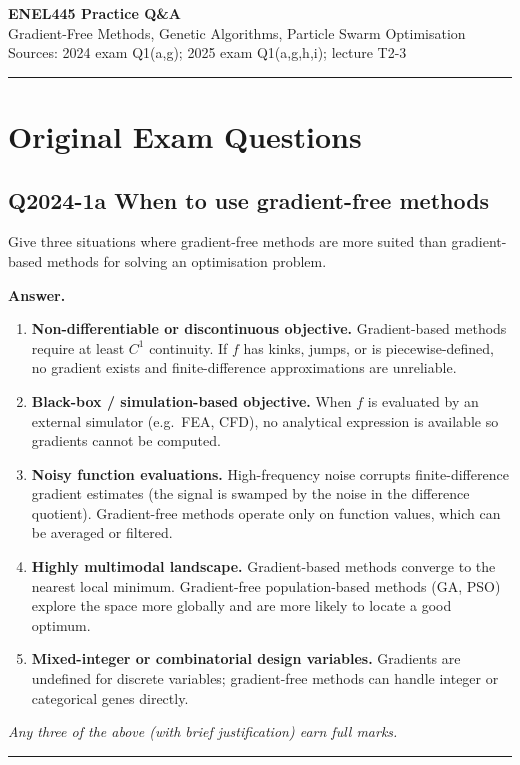 \documentclass[11pt,a4paper]{article}
\newcommand{\Q}[2]{\subsection*{Q#1 \quad #2}}
\newenvironment{answer}{\medskip\textbf{Answer.}\par}{\bigskip\hrule\bigskip}
\begin{document}
\begin{center}
  {\Large\bfseries ENEL445 Practice Q\&A}\\[4pt]
  Gradient-Free Methods, Genetic Algorithms, Particle Swarm Optimisation\\[2pt]
  {\small Sources: 2024 exam Q1(a,g); 2025 exam Q1(a,g,h,i); lecture T2-3}
\end{center}

\bigskip
\hrule
\bigskip

\section*{Original Exam Questions}

\Q{2024-1a}{[3 marks] When to use gradient-free methods}
Give three situations where gradient-free methods are more suited than
gradient-based methods for solving an optimisation problem.

\begin{answer}
\begin{enumerate}[leftmargin=*, label=\arabic{*}.]
  \item \textbf{Non-differentiable or discontinuous objective.}
    Gradient-based methods require at least $C^1$ continuity.
    If $f$ has kinks, jumps, or is piecewise-defined, no gradient exists
    and finite-difference approximations are unreliable.

  \item \textbf{Black-box / simulation-based objective.}
    When $f$ is evaluated by an external simulator (e.g.\ FEA, CFD),
    no analytical expression is available so gradients cannot be computed.

  \item \textbf{Noisy function evaluations.}
    High-frequency noise corrupts finite-difference gradient estimates
    (the signal is swamped by the noise in the difference quotient).
    Gradient-free methods operate only on function values, which can be
    averaged or filtered.

  \item[\textit{(alt)}] \textbf{Highly multimodal landscape.}
    Gradient-based methods converge to the nearest local minimum.
    Gradient-free population-based methods (GA, PSO) explore the
    space more globally and are more likely to locate a good optimum.

  \item[\textit{(alt)}] \textbf{Mixed-integer or combinatorial design variables.}
    Gradients are undefined for discrete variables; gradient-free
    methods can handle integer or categorical genes directly.
\end{enumerate}
\textit{Any three of the above (with brief justification) earn full marks.}
\end{answer}
\end{document}
